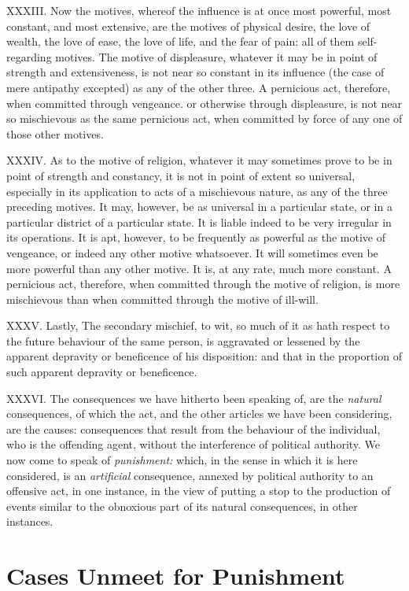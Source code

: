 \documentclass[12pt]{report}
\begin{document}
XXXIII. Now the motives, whereof the influence is at once most powerful,
most constant, and most extensive, are the motives of physical desire,
the love of wealth, the love of ease, the love of life, and the fear of
pain: all of them self-regarding motives. The motive of displeasure,
whatever it may be in point of strength and extensiveness, is not near
so constant in its influence (the case of mere antipathy excepted) as
any of the other three. A pernicious act, therefore, when committed
through vengeance. or otherwise through displeasure, is not near so
mischievous as the same pernicious act, when committed by force of any
one of those other motives.

XXXIV. As to the motive of religion, whatever it may sometimes prove to
be in point of strength and constancy, it is not in point of extent so
universal, especially in its application to acts of a mischievous
nature, as any of the three preceding motives. It may, however, be as
universal in a particular state, or in a particular district of a
particular state. It is liable indeed to be very irregular in its
operations. It is apt, however, to be frequently as powerful as the
motive of vengeance, or indeed any other motive whatsoever. It will
sometimes even be more powerful than any other motive. It is, at any
rate, much more constant. A pernicious act, therefore, when committed
through the motive of religion, is more mischievous than when committed
through the motive of ill-will.

XXXV. Lastly, The secondary mischief, to wit, so much of it as hath
respect to the future behaviour of the same person, is aggravated or
lessened by the apparent depravity or beneficence of his disposition:
and that in the proportion of such apparent depravity or beneficence.

XXXVI. The consequences we have hitherto been speaking of, are the
\emph{natural} consequences, of which the act, and the other articles we
have been considering, are the causes: consequences that result from the
behaviour of the individual, who is the offending agent, without the
interference of political authority. We now come to speak of
\emph{punishment:} which, in the sense in which it is here considered,
is an \emph{artificial} consequence, annexed by political authority to
an offensive act, in one instance, in the view of putting a stop to the
production of events similar to the obnoxious part of its natural
consequences, in other instances.

\chapter{Cases Unmeet for Punishment}
\end{document}
